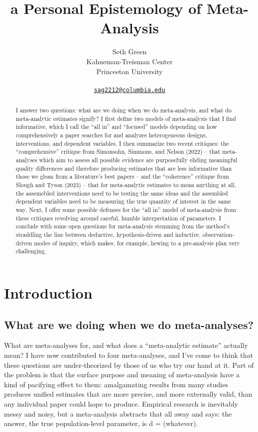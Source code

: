 \documentclass{article}
\title{a Personal Epistemology of Meta-Analysis}
\author{
    Seth Green
   \\
    Kahneman-Treisman Center \\
    Princeeton University \\
   \\
  \texttt{\href{mailto:sag2212@columbia.edu}{\nolinkurl{sag2212@columbia.edu}}} \\
  }
\begin{document}
\maketitle


\begin{abstract}
I answer two questions: what are we doing when we do meta-analysis, and
what do meta-analytic estimates signify? I first define two models of
meta-analysis that I find informative, which I call the ``all in'' and
``focused'' models depending on how comprehensively a paper searches for
and analyzes heterogeneous designs, interventions, and dependent
variables. I then summarize two recent critiques: the ``comprehensive''
critique from Simonsohn, Simmons, and Nelson (2022) -- that
meta-analyses which aim to assess all possible evidence are purposefully
eliding meaningful quality differences and therefore producing estimates
that are less informative than those we glean from a literature's best
papers -- and the ``coherence'' critique from Slough and Tyson (2023) --
that for meta-analytic estimates to mean anything at all, the assemebled
interventions need to be testing the same ideas and the assembled
dependent variables need to be measuring the true quantity of interest
in the same way. Next, I offer some possible defenses for the ``all in''
model of meta-analysis from these critiques revolving around careful,
humble interpretation of parameters. I conclude with some open questions
for meta-analysis stemming from the method's straddling the line between
deductive, hypothesis-driven and inductive, observation-driven modes of
inquiry, which makes, for example, hewing to a pre-analysis plan very
challenging.
\end{abstract}


\section{Introduction}\label{introduction}

\subsection{What are we doing when we do
meta-analyses?}\label{what-are-we-doing-when-we-do-meta-analyses}

What are meta-analyses for, and what does a ``meta-analytic estimate''
actually mean? I have now contributed to four meta-analyses, and I've
come to think that these questions are under-theorized by those of us
who try our hand at it. Part of the problem is that the surface purpose
and meaning of meta-analysis have a kind of pacifying effect to them:
amalgamating results from many studies produces unified estimates that
are more precise, and more externally valid, than any individual paper
could hope to produce. Empirical research is inevitably messy and noisy,
but a meta-analysis abstracts that all away and says: the answer, the
true population-level parameter, is d = (whatever).
\end{document}
